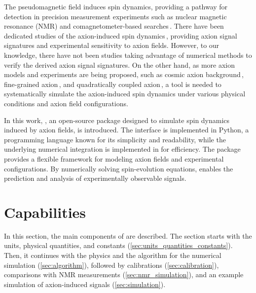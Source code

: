 The pseudomagnetic field induces spin dynamics, providing a pathway for detection in precision measurement experiments such as nuclear magnetic resonance (NMR) and comagnetometer-based searches\,\cite{ouellet2019first, du2018search, ALPHA2023,aja2022canfranc,CAPP2024,brouwer2022projected,alesini2023future,ZhongL2018results,garcia2024searchaxiondarkmatter,Quiskamp2024_ORGAN,rettaroli2024search,Gramolin2021_Ferromagnetic,gavilan2024searching,bloch2105nasduck,abel2023_HgDM,karanth2023first,LeeJunyi2023_NeutronSpin,capozzi2023new, CASPErProposal2014, kimball2018overview, wang2018application, aybas2021_SolidStateNMR, CASPEr_ZULF_2019,Walter2025_CASPErG}. 
There have been dedicated studies of the axion-induced spin dynamics\,\cite{Aybas_2021_Quantum_sensitivity, Dror2023_SensitivityAxion, Yuzhe2023_FrequencyScanning}, providing axion signal signatures and experimental sensitivity to axion fields. 
However, to our knowledge, there have not been studies taking advantage of numerical methods to verify the derived axion signal signatures. 
On the other hand, as more axion models and experiments are being proposed, such as cosmic axion background\,\cite{Dror2021_CosmicAxionBackground,Nitta2023_ADMX_CosmicAxionBackground}, fine-grained axion\,\cite{OHare2025_Finegrained}, and quadratically coupled axion\,\cite{GanXucheng2026_quadraticPTA, huang2026earthmatterenhancedaxion}, a tool is needed to systematically simulate the axion-induced spin dynamics under various physical conditions and axion field configurations.

In this work, \axionbloch{}, an open-source package designed to simulate spin dynamics induced by axion fields, is introduced. 
The interface is implemented in Python, a programming language known for its simplicity and readability, while the underlying numerical integration is implemented in  for efficiency. 
The package provides a flexible framework for modeling axion fields and experimental configurations. 
By numerically solving spin-evolution equations, \axionbloch{} enables the prediction and analysis of experimentally observable signals.

\section{Capabilities}
\label{sec:capabilities}

In this section, the main components of \axionbloch{} are described. The section starts with the units, physical quantities, and constants (\cref{sec:units_quantities_constants}). Then, it continues with the physics and the algorithm for the numerical simulation (\cref{sec:algorithm}), followed by calibrations (\cref{sec:calibration}), comparisons with NMR measurements (\cref{sec:nmr_simulation}), and an example simulation of axion-induced signals (\cref{sec:simulation}). 

